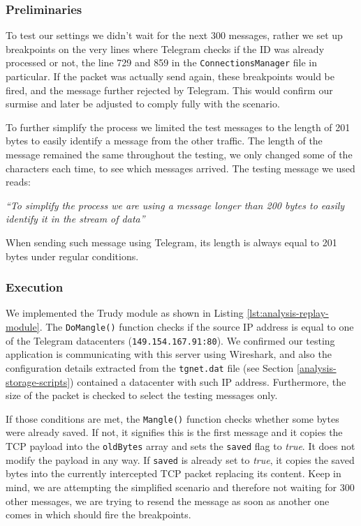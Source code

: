 \documentclass[thesis=M,english]{FITthesis}[2012/10/20]
\begin{document}
\subsubsection{Preliminaries}

To test our settings we didn't wait for the next 300 messages, rather we set up breakpoints on the very lines where Telegram checks if the ID was already processed or not, the line 729 and 859 in the \texttt{ConnectionsManager} file in particular. If the packet was actually send again, these breakpoints would be fired, and the message further rejected by Telegram. This would confirm our surmise and later be adjusted to comply fully with the scenario.

To further simplify the process we limited the test messages to the length of 201 bytes to easily identify a message from the other traffic. The length of the message remained the same throughout the testing, we only changed some of the characters each time, to see which messages arrived. The testing message we used reads:

\begin{displayquote}
\emph{``To simplify the process we are using a message longer than 200 bytes to easily identify it in the stream of data''}
\end{displayquote}

When sending such message using Telegram, its length is always equal to 201 bytes under regular conditions.

\subsubsection{Execution}

We implemented the Trudy module as shown in Listing \ref{lst:analysis-replay-module}. The \texttt{DoMangle()} function checks if the source IP address is equal to one of the Telegram datacenters (\texttt{149.154.167.91:80}). We confirmed our testing application is communicating with this server using Wireshark, and also the configuration details extracted from the \texttt{tgnet.dat} file (see Section \ref{analysis-storage-scripts}) contained a datacenter with such IP address. Furthermore, the size of the packet is checked to select the testing messages only.

If those conditions are met, the \texttt{Mangle()} function checks whether some bytes were already saved. If not, it signifies this is the first message and it copies the TCP payload into the \texttt{oldBytes} array and sets the \texttt{saved} flag to \emph{true}. It does not modify the payload in any way. If \texttt{saved} is already set to \emph{true}, it copies the saved bytes into the currently intercepted TCP packet replacing its content. Keep in mind, we are attempting the simplified scenario and therefore not waiting for 300 other messages, we are trying to resend the message as soon as another one comes in which should fire the breakpoints.
\end{document}
